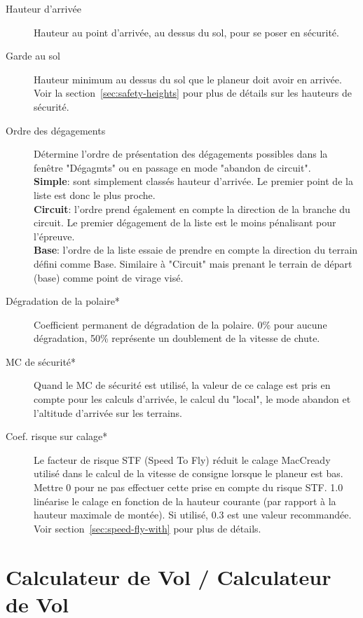 \begin{description}
\item[Hauteur d'arrivée]  Hauteur au point d'arrivée, au dessus du sol, pour se poser en sécurité.
\item[Garde au sol]  \label{conf:safetyterrain} Hauteur minimum au dessus du sol que le planeur doit avoir en arrivée.\\
Voir la section~\ref{sec:safety-heights} pour plus de détails sur les hauteurs de sécurité.\\
\item[Ordre des dégagements]  \label{conf:alternatesmode} Détermine l'ordre de présentation des dégagements possibles dans la fenêtre "Dégagmts" ou en passage en mode "abandon de circuit".\\
  {\bf Simple}: sont simplement classés hauteur d'arrivée. Le premier point de la liste est donc le plus proche.\\
  {\bf Circuit}:  l'ordre prend également en compte la direction de la branche du circuit. Le premier dégagement de la liste est le moins pénalisant pour l'épreuve.\\
  {\bf Base}: l'ordre de la liste essaie de prendre en compte la direction du terrain défini comme Base. Similaire à "Circuit" mais prenant le terrain de départ (base) comme point de virage visé.
\item[Dégradation de la polaire*]  Coefficient permanent de dégradation de la polaire. 0\% pour aucune dégradation, 50\% représente un doublement de la vitesse de chute.
\item[MC de sécurité*]  Quand le MC de sécurité est utilisé, la valeur de ce calage est pris en compte pour les calculs d'arrivée, le calcul du "local", le mode abandon et l'altitude d'arrivée sur les terrains.
\item[Coef. risque sur calage*] Le facteur de risque STF (Speed To Fly) réduit le calage MacCready utilisé dans le calcul de la vitesse de consigne lorsque le planeur est bas. Mettre 0 pour ne pas effectuer cette prise en compte du risque STF. 1.0 linéarise le calage en fonction de la hauteur courante 
(par rapport à la hauteur maximale de montée). Si utilisé, 0.3 est une valeur recommandée. Voir section~\ref{sec:speed-fly-with} pour plus de détails.
\end{description}


\section{Calculateur de Vol / Calculateur de Vol}\label{sec:final-glide}

